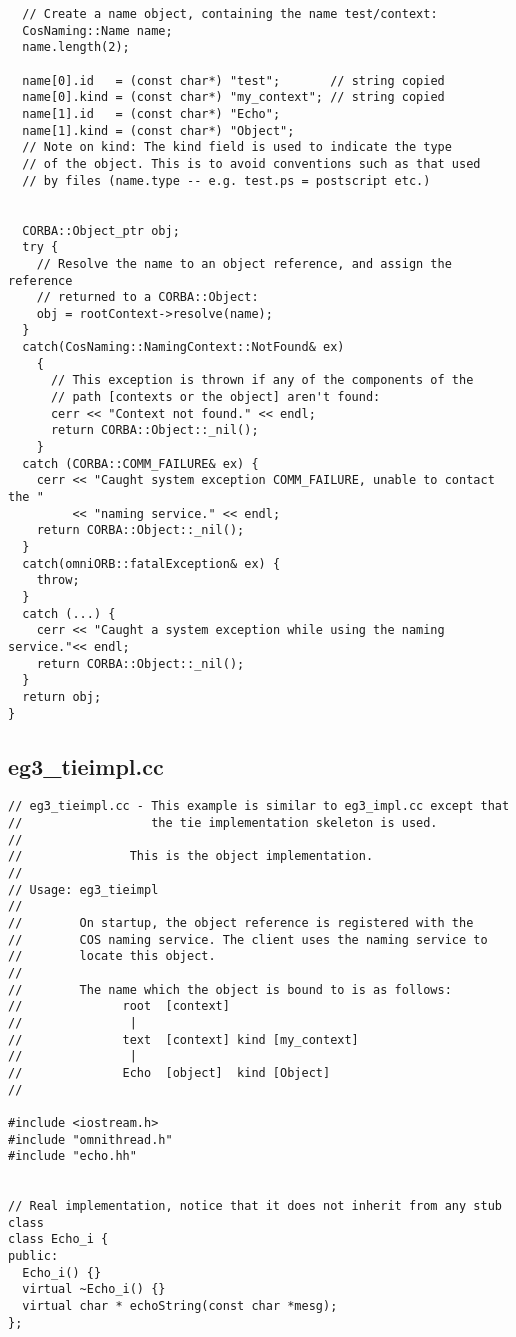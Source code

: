 \documentclass[11pt,twoside,onecolumn]{book}
\begin{document}
{\begin{verbatim}
  // Create a name object, containing the name test/context:
  CosNaming::Name name;
  name.length(2);

  name[0].id   = (const char*) "test";       // string copied
  name[0].kind = (const char*) "my_context"; // string copied
  name[1].id   = (const char*) "Echo";
  name[1].kind = (const char*) "Object";
  // Note on kind: The kind field is used to indicate the type
  // of the object. This is to avoid conventions such as that used
  // by files (name.type -- e.g. test.ps = postscript etc.)

  
  CORBA::Object_ptr obj;
  try {
    // Resolve the name to an object reference, and assign the reference 
    // returned to a CORBA::Object:
    obj = rootContext->resolve(name);
  }
  catch(CosNaming::NamingContext::NotFound& ex)
    {
      // This exception is thrown if any of the components of the
      // path [contexts or the object] aren't found:
      cerr << "Context not found." << endl;
      return CORBA::Object::_nil();
    }
  catch (CORBA::COMM_FAILURE& ex) {
    cerr << "Caught system exception COMM_FAILURE, unable to contact the "
         << "naming service." << endl;
    return CORBA::Object::_nil();
  }
  catch(omniORB::fatalException& ex) {
    throw;
  }
  catch (...) {
    cerr << "Caught a system exception while using the naming service."<< endl;
    return CORBA::Object::_nil();
  }
  return obj;
}
\end{verbatim}
\newpage

\subsection{eg3\_tieimpl.cc}
\begin{verbatim}
// eg3_tieimpl.cc - This example is similar to eg3_impl.cc except that
//                  the tie implementation skeleton is used.
//
//               This is the object implementation.
//
// Usage: eg3_tieimpl
//
//        On startup, the object reference is registered with the 
//        COS naming service. The client uses the naming service to
//        locate this object.
//
//        The name which the object is bound to is as follows:
//              root  [context]
//               |
//              text  [context] kind [my_context]
//               |
//              Echo  [object]  kind [Object]
//

#include <iostream.h>
#include "omnithread.h"
#include "echo.hh"


// Real implementation, notice that it does not inherit from any stub class
class Echo_i {
public:
  Echo_i() {}
  virtual ~Echo_i() {}
  virtual char * echoString(const char *mesg);
};


\end{verbatim}}
\end{document}

